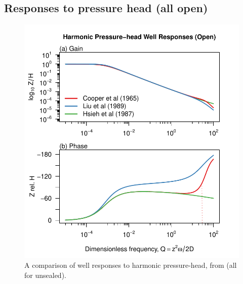 \documentclass[12pt]{article}\usepackage[]{graphicx}\usepackage[]{color}
\makeatletter
\def\maxwidth{ %
  \ifdim\Gin@nat@width>\linewidth
    \linewidth
  \else
    \Gin@nat@width
  \fi
}
\newenvironment{knitrout}{}{} %
\makeatother
\begin{document}
\subsection{Responses to pressure head (all open)}
\begin{figure}[htb!]
\begin{center}
\begin{knitrout}\small
{}\color{fgcolor}
\includegraphics[width=\maxwidth]{figure/ALLORESPFIG} 

\end{knitrout}

\caption{A comparison of well responses to harmonic pressure-head, 
from \citet{cooper1965, hsieh1987, liu1989} (all for unsealed).}
\label{fig:owrsp-all}
\end{center}
\end{figure}




\printindex
\end{document}
